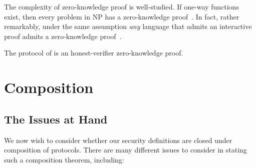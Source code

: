 The complexity of zero-knowledge proof is well-studied. If one-way functions
exist, then every problem in NP has a zero-knowledge proof~\cite{gmw-1991}. In
fact, rather remarkably, under the same assumption \emph{any} language that
admits an interactive proof admits a zero-knowledge
proof~\cite{ben-or-et-al-1990}.

\begin{ex}
  The protocol of 
  is an honest-verifier zero-knowledge proof.
\end{ex}

\section{Composition}
\label{sec:crypto-composition}

\subsection{The Issues at Hand}
\label{sec:composition-issues}

We now wish to consider whether our security definitions are closed under composition
of protocols. There are many different issues to consider in stating such a
composition theorem, including:

